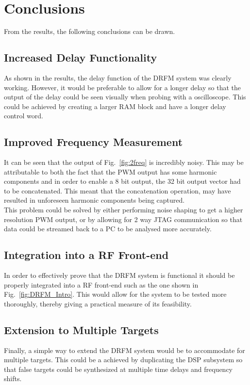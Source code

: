 \section{Conclusions}
\noindent From the results, the following conclusions can be drawn.
\subsection{Increased Delay Functionality}
\noindent As shown in the results, the delay function of the DRFM system was clearly working. However, it would be preferable to allow for a longer delay so that the output of the delay could be seen visually when probing with a oscilloscope. This could be achieved by creating a larger RAM block and have a longer delay control word. 
\subsection{Improved Frequency Measurement}
\noindent It can be seen that the output of Fig.~\ref{fig:2freq} is incredibly noisy. This may be attributable to both the fact that the PWM output has some harmonic components and in order to enable a 8 bit output, the 32 bit output vector had to be concatenated. This meant that the concatenation operation, may have resulted in unforeseen harmonic components being captured. \\ \newline This problem could be solved by either performing noise shaping to get a higher resolution PWM output, or by allowing for 2 way JTAG communication so that data could be streamed back to a PC to be analysed more accurately. 

\subsection{Integration into a RF Front-end}
\noindent In order to effectively prove that the DRFM system is functional it should be properly integrated into a RF front-end such as the one shown in Fig.~\ref{fig:DRFM_Intro}. This would allow for the system to be tested more thoroughly, thereby giving a practical measure of its feasibility.

\subsection{Extension to Multiple Targets}
\noindent Finally, a simple way to extend the DRFM system would be to accommodate for multiple targets. This could be a achieved by duplicating the DSP subsystem so that false targets could be synthesized at multiple time delays and frequency shifts. 





